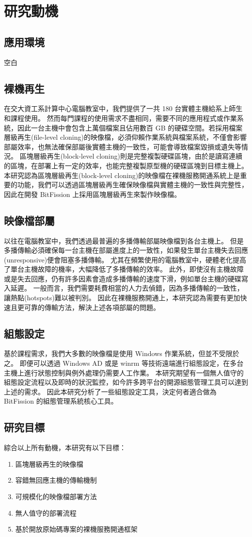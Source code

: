 \chapter{研究動機}
\section{應用環境}
空白
\section{裸機再生}
在交大資工系計算中心電腦教室中，我們提供了一共 180 台實體主機給系上師生和課程使用。
然而每門課程的使用需求不盡相同，需要不同的應用程式或作業系統，因此一台主機中會包含上萬個檔案且佔用數百 GB 的硬碟空間。若採用檔案層級再生(file-level cloning)的映像檔，必須仰賴作業系統與檔案系統，不僅會影響部屬效率，也無法確保部屬後實體主機的一致性，可能會導致檔案毀損或遺失等情況。
區塊層級再生(block-level cloning)則是完整複製硬碟區塊，由於是讀寫連續的區塊，在部署上有一定的效率，也能完整複製原型機的硬碟區塊到目標主機上。
本研究認為區塊層級再生(block-level cloning)的映像檔在裸機服務開通系統上是重要的功能，我們可以透過區塊層級再生確保映像檔與實體主機的一致性與完整性，因此在開發 BitFission 上採用區塊層級再生來製作映像檔。
\section{映像檔部屬}
以往在電腦教室中，我們透過最普遍的多播傳輸部屬映像檔到各台主機上。
但是多播傳輸必須確保每一台主機在部屬進度上的一致性，如果發生單台主機失去回應(unresponsive)便會阻塞多播傳輸。
尤其在頻繁使用的電腦教室中，硬體老化提高了單台主機故障的機率，大幅降低了多播傳輸的效率。
此外，即使沒有主機故障或是失去回應，仍有許多因素會造成多播傳輸的速度下滑，例如單台主機的硬碟寫入延遲。
一般而言，我們需要耗費相當的人力去偵錯，因為多播傳輸的一致性，讓熱點(hotspots)難以被判別。
因此在裸機服務開通上，本研究認為需要有更加快速且更可靠的傳輸方法，解決上述各項部屬的問題。
\section{組態設定}
基於課程需求，我們大多數的映像檔是使用 Windows 作業系統，但並不受限於之。
即便可以透過 Windows AD 或是 winrm 等技術遠端進行組態設定，在多台主機上進行狀態控制與例外處理仍需要人工作業。
本研究期望有一個無人值守的組態設定流程以及即時的狀況監控，如今許多跨平台的開源組態管理工具可以達到上述的需求。
因此本研究分析了一些組態設定工具，決定何者適合做為 BitFission 的組態管理系統核心工具。

\section{研究目標}
綜合以上所有動機，本研究有以下目標：
\begin{enumerate}
\item 區塊層級再生的映像檔
\item 容錯無回應主機的傳輸機制
\item 可規模化的映像檔部署方法
\item 無人值守的部署流程
\item 基於開放原始碼專案的裸機服務開通框架
\end{enumerate}

